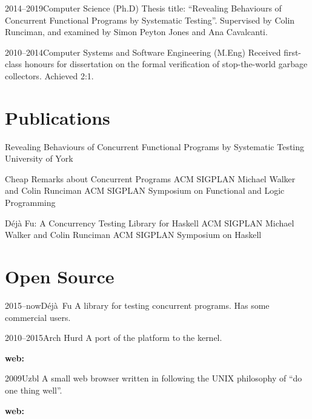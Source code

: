 \documentclass[a4paper]{barrucadu-cv}
\newcommand{\range}[2]{#1–#2}
\newcommand{\orange}[1]{\range{#1}{now}}
\begin{document}
\begin{cventry}{\range{2014}{2019}}{Computer Science (Ph.D)}
  Thesis title: ``Revealing Behaviours of Concurrent Functional
  Programs by Systematic Testing''.  Supervised by Colin Runciman, and
  examined by Simon Peyton Jones and Ana Cavalcanti.
\end{cventry}

\begin{cventry}{\range{2010}{2014}}{Computer Systems and Software Engineering (M.Eng)}
  Received first-class honours for dissertation on the formal
  verification of stop-the-world garbage collectors.  Achieved 2:1.
\end{cventry}

\section{Publications}

  {Revealing Behaviours of Concurrent Functional Programs by Systematic Testing}
  {University of York}

  {Cheap Remarks about Concurrent Programs}
  {ACM SIGPLAN}
  {Michael Walker and Colin Runciman}
  {ACM SIGPLAN Symposium on Functional and Logic Programming}

  {Déjà Fu: A Concurrency Testing Library for Haskell}
  {ACM SIGPLAN}
  {Michael Walker and Colin Runciman}
  {ACM SIGPLAN Symposium on Haskell}

\section{Open Source}

\begin{cventry}{\orange{2015}}{D\'{e}j\`{a}~Fu}
  A library for testing concurrent  programs. Has
  some commercial users.

  \textbf{\small{}}
\end{cventry}

\begin{cventry}{\range{2010}{2015}}{Arch Hurd}
  A port of the  platform to the
   kernel.

  \textbf{\small web: }
\end{cventry}

\begin{cventry}{2009}{Uzbl}
  A small web browser written in  following the UNIX
  philosophy of ``do one thing well''.

  \textbf{\small web: }
\end{cventry}
\end{document}
